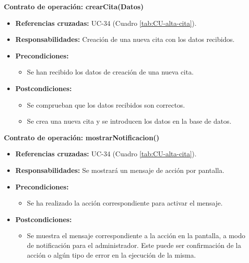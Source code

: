 \textbf{Contrato de operación: crearCita(Datos)}
\begin{itemize}
\item \textbf{Referencias cruzadas:} UC-34 (Cuadro \ref{tab:CU-alta-cita}).
\item \textbf{Responsabilidades:} Creación de una nueva cita con los datos recibidos.
\item \textbf{Precondiciones:} 
 \begin{itemize}
\item Se han recibido los datos de creación de una nueva cita.
\end {itemize}
\item \textbf{Postcondiciones:} 
 \begin{itemize}
 \item Se comprueban que los datos recibidos son correctos.
\item Se crea una nueva cita y se introducen los datos en la base de datos.
\end {itemize}
\end {itemize}

\textbf{Contrato de operación: mostrarNotificacion()}
\begin{itemize}
\item \textbf{Referencias cruzadas:} UC-34 (Cuadro \ref{tab:CU-alta-cita}).
\item \textbf{Responsabilidades:} Se mostrará un mensaje de acción por pantalla.
\item \textbf{Precondiciones:} 
 \begin{itemize}
\item Se ha realizado la acción correspondiente para activar el mensaje.
\end {itemize}
\item \textbf{Postcondiciones:} 
 \begin{itemize}
\item Se muestra el mensaje correspondiente a la acción en la pantalla, a modo de notificación para el administrador. Este puede ser confirmación de la acción o algún tipo de error en la ejecución de la misma.
\end {itemize}
\end {itemize}


\vspace{10mm}

